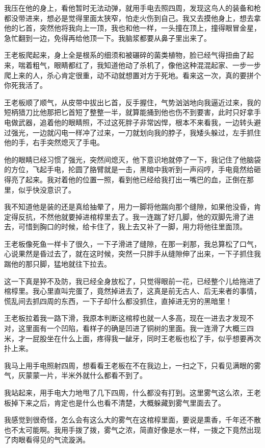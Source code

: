 我压在他的身上，看他暂时无法动弹，就用手电去照四周，发现这鸟人的装备和枪都没带进来，想必是觉得里面太狭窄，怕走火伤到自己。我又去摸他身上，想去拿他的匕首，突然他将我向上一顶，我也和他一样，一头撞在顶上，撞得眼冒金星，急忙翻到一边，免得再给他顶一下。我脑浆都要从鼻子里出来了。

王老板爬起来，身上全是根系的细须和被碾碎的菌类植物，脸已经气得扭曲了起来，喘着粗气，眼睛都红了，我知道他动了杀机了，像他这种混混起家、一步一步爬上来的人，杀心肯定很重，动不动就想置对方于死地。看来这一次，真的要拼个你死我活了。

王老板顺了顺气，从皮带中拔出匕首，反手握住，气势汹汹地向我逼近过来，我的短柄猎刀比他那把匕首短了整整一半，就算能捅到他也伤不到要害，此时只好拿手电做武器，追着他的眼睛照，不过这死胖子非常凶悍，根本不来看我，一边转头避过强光，一边就闪电一样冲了过来，一刀就划向我的脖子，我矮头躲过，左手抓住他的手，右手突然熄灭了手电。

他的眼睛已经习惯了强光，突然间熄灭，他下意识地就停了一下，我记住了他脑袋的方位，飞起手电，抡圆了胳臂就是一击，黑暗中我听到一声闷哼，手电竟然给砸得亮了起来。我对着他的位置一照，看到他已经给我打出一嘴巴的血，正倒在那里，似乎快没意识了。

我不知道他是装的还是真给抽晕了，用力一脚将他踹向那个缝隙，如果他没昏，肯定得反抗，不然他就要掉进棺椁里去了。我一连踹了好几脚，他的双脚先滑了进去，可惜到胸口的时候，给卡住了，我上去又补了一脚，用力将他往里面顶。

王老板像死鱼一样卡了很久，一下子滑进了缝隙，在那一刹那，我总算松了口气，心说果然是昏过去了，就在这时候，突然一只胖手从缝隙伸了出来，一下子抓住我踹他的那只脚，猛地就往下拉去。

这一下真是猝不及防，我已经全身放松了，只觉得眼前一花，已经整个儿给拖进了棺椁里。我心里直叫完蛋了，竟然掉进去了，这真是前无古人、后无来者的事情，慌乱间去抓四周的东西，一下子却什么都没抓住，直掉进无穷的黑暗里！

王老板拉着我一路下滑，我原本判断这棺椁也就一人多高，现在一进去才发现不对，这里面有一个凹陷，看样子的确是凹进了铜树的里面。我一连滑了大概三四米，才一屁股坐在什么上面，疼得我一龇牙，同时王老板也松了手，似乎想要再次扑上来。

我马上用手电照射四周，想看看王老板在不在我边上，一扫之下，只看见满眼的雾气，灰蒙蒙一片，半米外就什么都看不到了。

我站起来，用手电大力地甩了几下四周，什么都没有打到。这里雾气这么浓，王老板掉下来之后，肯定也是什么也看不清楚，大概躲藏到雾气里面去了。

我感觉到很奇怪，怎么会有这么大的雾气在这棺椁里面，要说是熏香，千年还不散也不太可能啊。我用手拨了拨，雾气之浓，简直好像是水一样，一拨之下竟然出现了肉眼看得见的气流漩涡。

